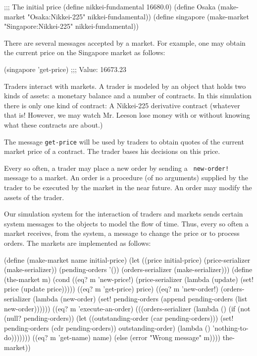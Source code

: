 \beginlisp
;;; The initial price
(define nikkei-fundamental 16680.0)
\null
(define Osaka
  (make-market "Osaka:Nikkei-225" nikkei-fundamental))
\null
(define singapore
  (make-market "Singapore:Nikkei-225" nikkei-fundamental))
\endlisp

There are several messages accepted by a market.  For example, one may
obtain the current price on the Singapore market as follows:

\beginlisp
(singapore 'get-price)
;;; Value: 16673.23
\endlisp

Traders interact with markets.  A trader is modeled by an object that
holds two kinds of assets: a monetary balance and a number of
contracts.  In this simulation there is only one kind of contract: A
Nikkei-225 derivative contract (whatever that is!  However, we may
watch Mr. Leeson lose money with or without knowing what these
contracts are about.)

The message {\tt get-price} will be used by traders to obtain quotes
of the current market price of a contract.  The trader bases his
decisions on this price.

Every so often, a trader may place a new order by sending a {\tt
new-order!} message to a market.  An order is a procedure (of no
arguments) supplied by the trader to be executed by the market in the
near future.  An order may modify the assets of the trader.

Our simulation system for the interaction of traders and markets sends
certain system messages to the objects to model the flow of time.
Thus, every so often a market receives, from the system, a message to
change the price or to process orders.  The markets are implemented as
follows:

\beginlisp
(define (make-market name initial-price)
  (let ((price initial-price)
        (price-serializer (make-serializer))
        (pending-orders '())
        (orders-serializer (make-serializer)))
    (define (the-market m)
      (cond ((eq? m 'new-price!)
             (price-serializer
              (lambda (update)
                (set! price (update price)))))
            ((eq? m 'get-price) price)
            ((eq? m 'new-order!)
             (orders-serializer
              (lambda (new-order)
                (set! pending-orders
                      (append pending-orders (list new-order))))))
            ((eq? m 'execute-an-order)
             (((orders-serializer
                (lambda ()
                  (if (not (null? pending-orders))
                      (let ((outstanding-order (car pending-orders)))
                        (set! pending-orders (cdr pending-orders))
                        outstanding-order)
                      (lambda () 'nothing-to-do)))))))
            ((eq? m 'get-name) name)
            (else (error "Wrong message" m))))
    the-market))
\endlisp

